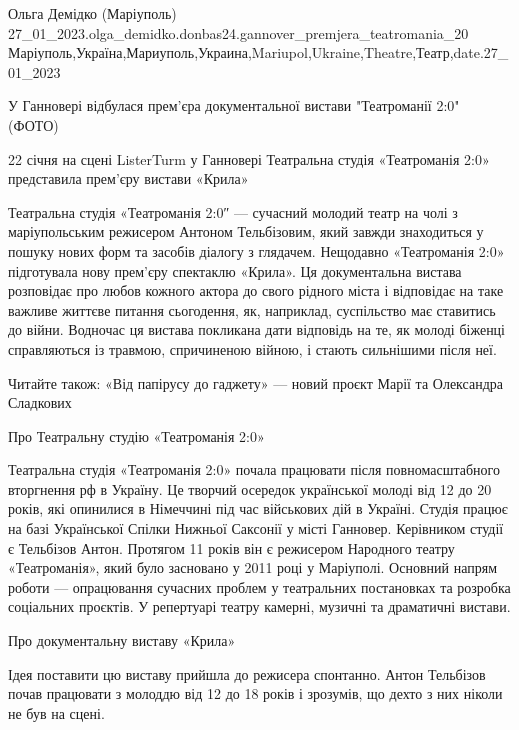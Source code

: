  
 
 
 
 

Ольга Демідко (Маріуполь)
27_01_2023.olga_demidko.donbas24.gannover_premjera_teatromania_20
Маріуполь,Україна,Мариуполь,Украина,Mariupol,Ukraine,Theatre,Театр,date.27_01_2023

У Ганновері відбулася прем'єра документальної вистави "Театроманії 2:0" (ФОТО)

22 січня на сцені ListerTurm у Ганновері Театральна студія «Театроманія 2:0»
представила прем'єру вистави «Крила»

Театральна студія «Театроманія 2:0″ — сучасний молодий театр на чолі з
маріупольським режисером Антоном Тельбізовим, який завжди знаходиться у пошуку
нових форм та засобів діалогу з глядачем. Нещодавно «Театроманія 2:0»
підготувала нову прем'єру спектаклю «Крила». Ця документальна вистава
розповідає про любов кожного актора до свого рідного міста і відповідає на таке
важливе життєве питання сьогодення, як, наприклад, суспільство має ставитись до
війни. Водночас ця вистава покликана дати відповідь на те, як молоді біженці
справляються із травмою, спричиненою війною, і стають сильнішими після неї.

Читайте також: «Від папірусу до гаджету» — новий проєкт Марії та Олександра
Сладкових

Про Театральну студію «Театроманія 2:0»

Театральна студія «Театроманія 2:0» почала працювати після повномасштабного
вторгнення рф в Україну. Це творчий осередок української молоді від 12 до 20
років, які опинилися в Німеччині під час військових дій в Україні. Студія
працює на базі Української Спілки Нижньої Саксонії у місті Ганновер. Керівником
студії є Тельбізов Антон. Протягом 11 років він є режисером Народного театру
«Театроманія», який було засновано у 2011 році у Маріуполі. Основний напрям
роботи — опрацювання сучасних проблем у театральних постановках та розробка
соціальних проєктів. У репертуарі театру камерні, музичні та драматичні
вистави.

Про документальну виставу «Крила»

Ідея поставити цю виставу прийшла до режисера спонтанно. Антон Тельбізов почав
працювати з молоддю від 12 до 18 років і зрозумів, що дехто з них ніколи не був
на сцені.

